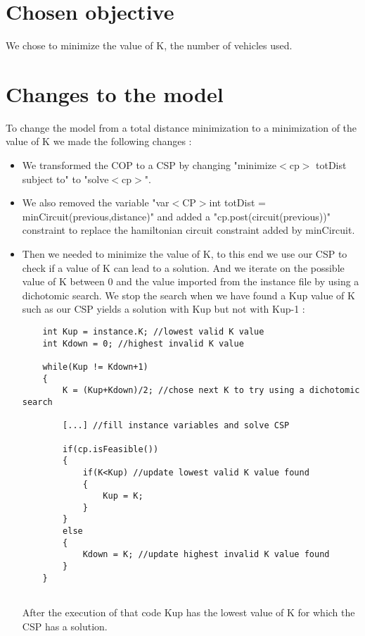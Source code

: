 \documentclass{eplDoc}
\begin{document}
\section{Chosen objective}

We chose to minimize the value of K, the number of vehicles used. 

\section{Changes to the model}

To change the model from a total distance minimization to a minimization of the value of K we made the following changes : 
\begin{itemize}
	\item We transformed the COP to a CSP by changing "minimize$<$cp$>$ totDist subject to" to "solve$<$cp$>$". 
	\item We also removed the variable "var$<$CP$>${int} totDist = minCircuit(previous,distance)" and added a "cp.post(circuit(previous))" constraint to replace the hamiltonian circuit constraint added by minCircuit. 
	\item Then we needed to minimize the value of K, to this end we use our CSP to check if a value of K can lead to a solution. And we iterate on the possible value of K between 0 and the value imported from the instance file by using a dichotomic search. We stop the search when we have found a Kup value of K such as our CSP yields a solution with Kup but not with Kup-1 : 
	\begin{lstlisting}
	int Kup = instance.K; //lowest valid K value
	int Kdown = 0; //highest invalid K value
	
	while(Kup != Kdown+1)
	{
		K = (Kup+Kdown)/2; //chose next K to try using a dichotomic search
		
		[...] //fill instance variables and solve CSP 
		
		if(cp.isFeasible())
		{
			if(K<Kup) //update lowest valid K value found
			{
				Kup = K;
			}
		}
		else
		{
			Kdown = K; //update highest invalid K value found
		}
	}
	
	\end{lstlisting}
	After the execution of that code Kup has the lowest value of K for which the CSP has a solution. 
\end{itemize}
\end{document}
